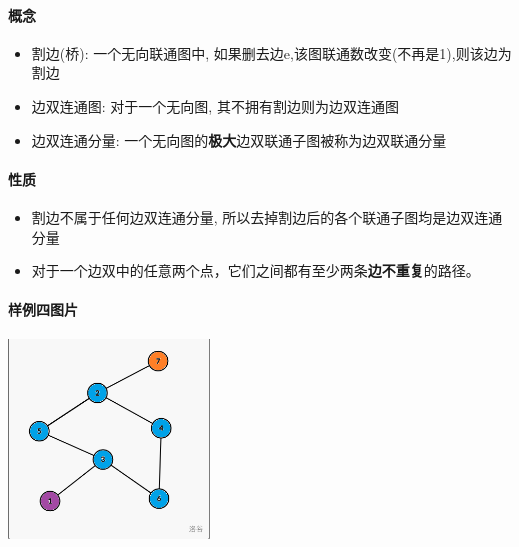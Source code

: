 \paragraph{概念}

\begin{itemize}
    \item 割边(桥): 一个无向联通图中, 如果删去边e,该图联通数改变(不再是1),则该边为割边
    \item 边双连通图: 对于一个无向图, 其不拥有割边则为边双连通图
    \item 边双连通分量: 一个无向图的\textbf{极大}边双联通子图被称为边双联通分量
\end{itemize}

\paragraph{性质}

\begin{itemize}
    \item 割边不属于任何边双连通分量, 所以去掉割边后的各个联通子图均是边双连通分量
    \item 对于一个边双中的任意两个点，它们之间都有至少两条\textbf{边不重复}的路径。
\end{itemize}

\paragraph{样例四图片}

\includegraphics[width=0.4\textwidth]{img/luogu-P8436-1.png}
